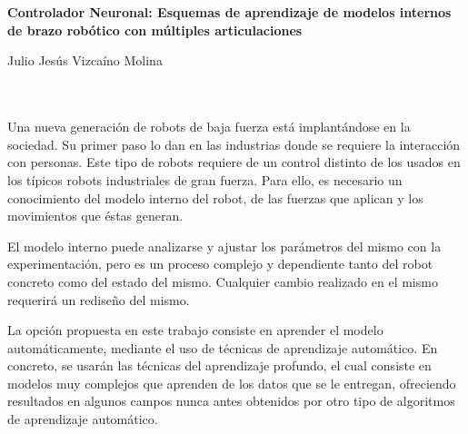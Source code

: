 \chapter*{}






\cleardoublepage
\thispagestyle{empty}

\begin{center}
{\large\bfseries Controlador Neuronal: Esquemas de aprendizaje de modelos internos de brazo robótico con múltiples articulaciones}\\
\end{center}
\begin{center}
Julio Jesús Vizcaíno Molina\\
\end{center}

\\

\vspace{0.7cm}
\\

Una nueva generación de robots de baja fuerza está implantándose en la sociedad. Su primer paso lo dan en las industrias donde se requiere la interacción con personas. Este tipo de robots requiere de un control distinto de los usados en los típicos robots industriales de gran fuerza. Para ello, es necesario un conocimiento del modelo interno del robot, de las fuerzas que aplican y los movimientos que éstas generan.

El modelo interno puede analizarse y ajustar los parámetros del mismo con la experimentación, pero es un proceso complejo y dependiente tanto del robot concreto como del estado del mismo. Cualquier cambio realizado en el mismo requerirá un rediseño del mismo.

La opción propuesta en este trabajo consiste en aprender el modelo automáticamente, mediante el uso de técnicas de aprendizaje automático. En concreto, se usarán las técnicas del aprendizaje profundo, el cual consiste en modelos muy complejos que aprenden de los datos que se le entregan, ofreciendo resultados en algunos campos nunca antes obtenidos por otro tipo de algoritmos de aprendizaje automático.

